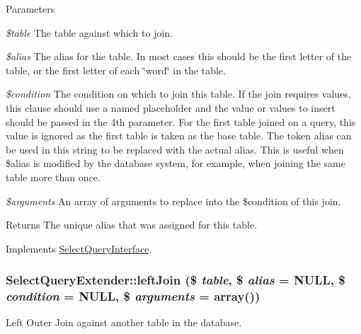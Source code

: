\begin{DoxyParams}{Parameters}
\item[{\em \$table}]The table against which to join. \item[{\em \$alias}]The alias for the table. In most cases this should be the first letter of the table, or the first letter of each \char`\"{}word\char`\"{} in the table. \item[{\em \$condition}]The condition on which to join this table. If the join requires values, this clause should use a named placeholder and the value or values to insert should be passed in the 4th parameter. For the first table joined on a query, this value is ignored as the first table is taken as the base table. The token alias can be used in this string to be replaced with the actual alias. This is useful when \$alias is modified by the database system, for example, when joining the same table more than once. \item[{\em \$arguments}]An array of arguments to replace into the \$condition of this join. \end{DoxyParams}
\begin{DoxyReturn}{Returns}
The unique alias that was assigned for this table. 
\end{DoxyReturn}


Implements \hyperlink{interfaceSelectQueryInterface_a596614bc76873c1487f87d30f892a651}{SelectQueryInterface}.\hypertarget{classSelectQueryExtender_aad9dd7062882479b2eb466fbe8dbd950}{
\subsubsection[{leftJoin}]{\setlength{\rightskip}{0pt plus 5cm}SelectQueryExtender::leftJoin (\$ {\em table}, \/  \$ {\em alias} = {\ttfamily NULL}, \/  \$ {\em condition} = {\ttfamily NULL}, \/  \$ {\em arguments} = {\ttfamily array()})}}
\label{classSelectQueryExtender_aad9dd7062882479b2eb466fbe8dbd950}
Left Outer Join against another table in the database.



